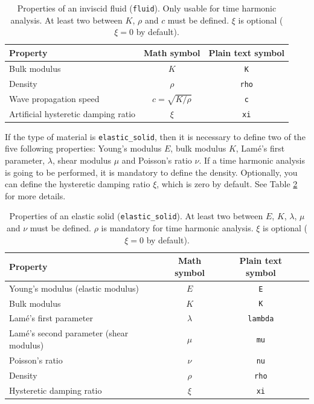 \documentclass[a4paper,fleqn]{book}
\begin{document}
\begin{table}
\centering
{\small
\begin{tabular}{lcc}
\textbf{Property} & \textbf{Math symbol} & \textbf{Plain text symbol} \\
\midrule
Bulk modulus             & $K$                & \texttt{K}   \\
Density                  & $\rho$             & \texttt{rho} \\
Wave propagation speed   & $c=\sqrt{K/\rho}$  & \texttt{c}   \\ 
Artificial hysteretic damping ratio  & $\xi$  & \texttt{xi} 
\end{tabular}
}
\caption{Properties of an inviscid fluid (\texttt{fluid}). Only usable for time harmonic analysis. At least two between $K$, $\rho$ and $c$ must be defined. $\xi$ is optional ($\xi=0$ by default).}
\label{tab:fluid}
\end{table}

If the type of material is \texttt{elastic\_solid}, then it is necessary to define two of the five following properties: Young's modulus $E$, bulk modulus $K$, Lam\'e's first parameter, $\lambda$, shear modulus $\mu$ and Poisson's ratio $\nu$. If a time harmonic analysis is going to be performed, it is mandatory to define the density. Optionally, you can define the hysteretic damping ratio $\xi$, which is zero by default. See Table \ref{tab:elastic} for more details.

\begin{table}
\centering
{\small
\begin{tabular}{lccl}
\textbf{Property} & \textbf{Math symbol} & \textbf{Plain text symbol} \\
\midrule
Young's modulus (elastic modulus)         & $E$       & \texttt{E}      \\
Bulk modulus                              & $K$       & \texttt{K}      \\
Lam\'e's first parameter                  & $\lambda$ & \texttt{lambda} \\
Lam\'e's second parameter (shear modulus) & $\mu$     & \texttt{mu}     \\
Poisson's ratio                           & $\nu$     & \texttt{nu}     \\
Density                                   & $\rho$    & \texttt{rho}    \\
Hysteretic damping ratio                  & $\xi$     & \texttt{xi}     
\end{tabular}
}
\caption{Properties of an elastic solid (\texttt{elastic\_solid}). At least two between $E$, $K$, $\lambda$, $\mu$ and $\nu$ must be defined. $\rho$ is mandatory for time harmonic analysis. $\xi$ is optional ($\xi=0$ by default).}
\label{tab:elastic}
\end{table}
\end{document}
